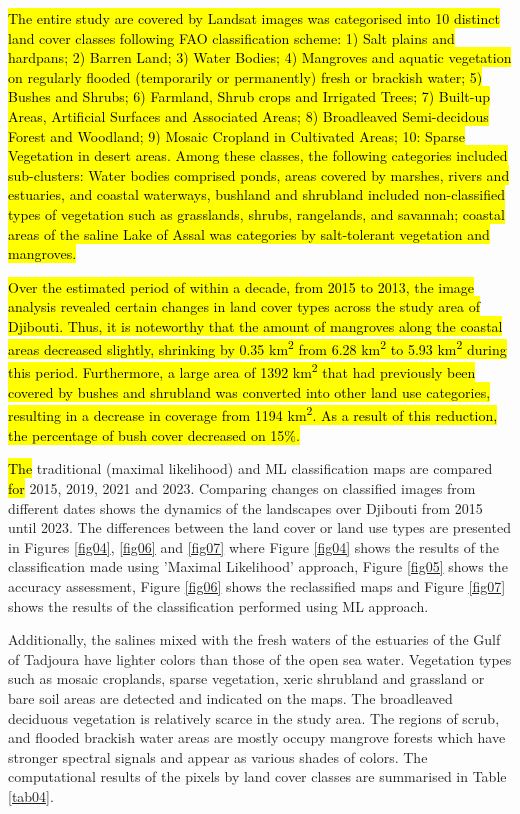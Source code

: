\documentclass[jimaging,article,submit,pdftex,moreauthors]{Definitions/mdpi}
\begin{document}
\hl{The entire study are covered by Landsat images was categorised into 10 distinct land cover classes following FAO classification scheme: 1) Salt plains and hardpans; 2) Barren Land; 3) Water Bodies; 4) Mangroves and aquatic vegetation on regularly flooded (temporarily or permanently) fresh or brackish water; 5) Bushes and Shrubs; 6) Farmland, Shrub crops and Irrigated Trees; 7) Built-up Areas, Artificial Surfaces and Associated Areas; 8) Broadleaved Semi-decidous Forest and Woodland; 9) Mosaic Cropland in Cultivated Areas; 10: Sparse Vegetation in desert areas. Among these classes, the following categories included sub-clusters: Water bodies comprised ponds, areas covered by marshes, rivers and estuaries, and coastal waterways, bushland and shrubland included non-classified types of vegetation such as grasslands, shrubs, rangelands, and savannah; coastal areas of the saline Lake of Assal was categories by salt-tolerant vegetation and mangroves.}

\hl{Over the estimated period of within a decade, from 2015 to 2013, the image analysis revealed certain changes in land cover types across the study area of Djibouti. Thus, it is noteworthy that the amount of mangroves along the coastal areas decreased slightly, shrinking by 0.35 km\textsuperscript{2} from 6.28 km\textsuperscript{2} to 5.93 km\textsuperscript{2} during this period. Furthermore, a large area of 1392 km\textsuperscript{2} that had previously been covered by bushes and shrubland was converted into other land use categories, resulting in a decrease in coverage from 1194 km\textsuperscript{2}. As a result of this reduction, the percentage of bush cover decreased on 15\%.}

\hl{The} traditional (maximal likelihood) and ML\hl{ }classification maps are compared \hl{for} 2015, 2019, 2021 and 2023. Comparing changes on classified images from different dates shows the dynamics of the landscapes over Djibouti from 2015 until 2023. The\hl{ }differences between the\hl{ }land cover or land use types are presented in Figures \ref{fig04}, \ref{fig06} and \ref{fig07} where Figure \ref{fig04} shows the results of the classification made using 'Maximal Likelihood' approach, Figure \ref{fig05} shows the accuracy assessment, Figure \ref{fig06} shows the reclassified maps and Figure \ref{fig07} shows the results of the classification performed using ML approach. 

Additionally, the salines mixed with the fresh waters of the estuaries of the Gulf of Tadjoura have lighter colors than those of the open sea water. Vegetation types such as mosaic croplands, sparse vegetation, xeric shrubland and grassland or bare soil areas are detected and indicated on the maps. The broadleaved deciduous vegetation is relatively scarce in the study area. The regions of scrub, and flooded brackish water areas are mostly occupy mangrove forests which have stronger spectral signals and appear as various shades of colors. The computational results of the pixels by land cover classes are summarised in Table \ref{tab04}.
\end{document}
